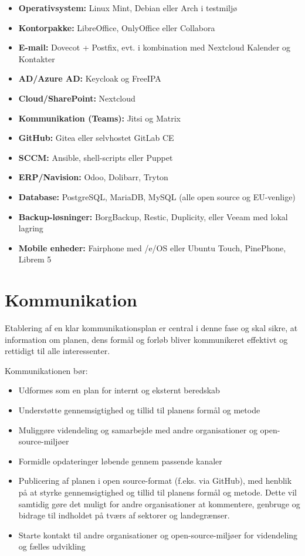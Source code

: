 \documentclass[a4paper,11pt]{book}
\begin{document}
\begin{itemize}
\tightlist
\item
  \textbf{Operativsystem:} Linux Mint, Debian eller Arch i testmiljø
\item
  \textbf{Kontorpakke:} LibreOffice, OnlyOffice eller Collabora
\item
  \textbf{E-mail:} Dovecot + Postfix, evt. i kombination med Nextcloud
  Kalender og Kontakter
\item
  \textbf{AD/Azure AD:} Keycloak og FreeIPA
\item
  \textbf{Cloud/SharePoint:} Nextcloud
\item
  \textbf{Kommunikation (Teams):} Jitsi og Matrix
\item
  \textbf{GitHub:} Gitea eller selvhostet GitLab CE
\item
  \textbf{SCCM:} Ansible, shell-scripts eller Puppet
\item
  \textbf{ERP/Navision:} Odoo, Dolibarr, Tryton
\item
  \textbf{Database:} PostgreSQL, MariaDB, MySQL (alle open source og
  EU-venlige)
\item
  \textbf{Backup-løsninger:} BorgBackup, Restic, Duplicity, eller Veeam
  med lokal lagring
\item
  \textbf{Mobile enheder:} Fairphone med /e/OS eller Ubuntu Touch,
  PinePhone, Librem 5
\end{itemize}

\section{Kommunikation}\label{kommunikation}

Etablering af en klar kommunikationsplan er central i denne fase og skal
sikre, at information om planen, dens formål og forløb bliver
kommunikeret effektivt og rettidigt til alle interessenter.

Kommunikationen bør:

\begin{itemize}
\tightlist
\item
  Udformes som en plan for internt og eksternt beredskab
\item
  Understøtte gennemsigtighed og tillid til planens formål og metode
\item
  Muliggøre videndeling og samarbejde med andre organisationer og
  open-source-miljøer
\item
  Formidle opdateringer løbende gennem passende kanaler
\item
  Publicering af planen i open source-format (f.eks. via GitHub), med
  henblik på at styrke gennemsigtighed og tillid til planens formål og
  metode. Dette vil samtidig gøre det muligt for andre organisationer at
  kommentere, genbruge og bidrage til indholdet på tværs af sektorer og
  landegrænser.
\item
  Starte kontakt til andre organisationer og open-source-miljøer for
  videndeling og fælles udvikling
\end{itemize}
\end{document}

